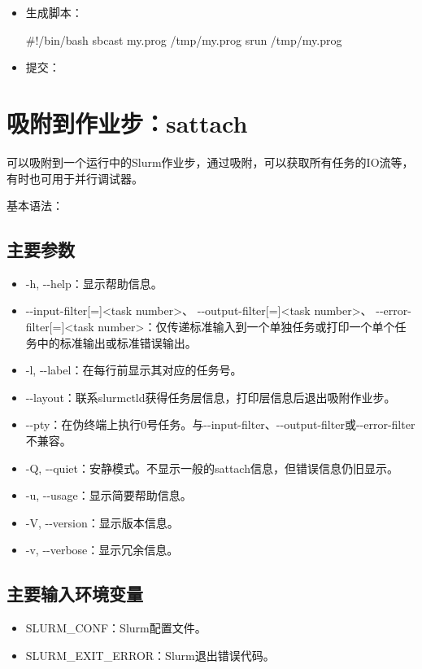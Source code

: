 \begin{itemize}
	\item 生成脚本：
\begin{SH}
#!/bin/bash
sbcast my.prog /tmp/my.prog
srun /tmp/my.prog
\end{SH}
	\item 提交：

\end{itemize}

\section{吸附到作业步：sattach}

可以吸附到一个运行中的Slurm作业步，通过吸附，可以获取所有任务的IO流等，有时也可用于并行调试器。

基本语法：

\subsection{主要参数}
\begin{itemize}
      \item -h, -{}-help：显示帮助信息。
      \item -{}-input-filter[=]<task number>、 -{}-output-filter[=]<task number>、 -{}-error-filter[=]<task number>：仅传递标准输入到一个单独任务或打印一个单个任务中的标准输出或标准错误输出。
      \item -l, -{}-label：在每行前显示其对应的任务号。
      \item -{}-layout：联系slurmctld获得任务层信息，打印层信息后退出吸附作业步。
      \item -{}-pty：在伪终端上执行0号任务。与-{}-input-filter、-{}-output-filter或-{}-error-filter不兼容。
      \item -Q, -{}-quiet：安静模式。不显示一般的sattach信息，但错误信息仍旧显示。
      \item -u, -{}-usage：显示简要帮助信息。
      \item -V, -{}-version：显示版本信息。
      \item -v, -{}-verbose：显示冗余信息。
\end{itemize}

\subsection{主要输入环境变量}
\begin{itemize}
	\item SLURM\_CONF：Slurm配置文件。
    \item SLURM\_EXIT\_ERROR：Slurm退出错误代码。
\end{itemize}

